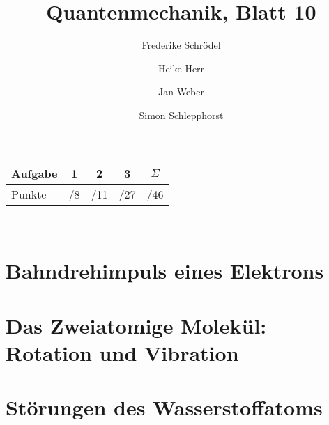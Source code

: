 \documentclass[11pt, ngerman, fleqn, DIV=15, headinclude]{scrartcl}
\title{Quantenmechanik, Blatt 10}
\author{
    Frederike Schrödel \and Heike Herr \and Jan Weber \and Simon Schlepphorst
}
\begin{document}
\maketitle
\begin{center}
	\begin{tabular}{l|c|c|c|c}
		Aufgabe &1&2&3&$\Sigma$\\
		\hline
		Punkte &\quad /8 & \quad /11 & \quad /27 & \quad /46
	\end{tabular}\\
\end{center}

\section{Bahndrehimpuls eines Elektrons}

\section{Das Zweiatomige Molekül: Rotation und Vibration}

\section{Störungen des Wasserstoffatoms}
\end{document}
